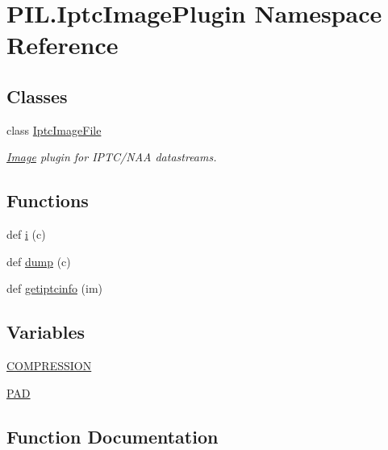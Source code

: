\hypertarget{namespacePIL_1_1IptcImagePlugin}{}\section{P\+I\+L.\+Iptc\+Image\+Plugin Namespace Reference}
\label{namespacePIL_1_1IptcImagePlugin}
\subsection*{Classes}
\begin{DoxyCompactItemize}
\item 
class \hyperlink{classPIL_1_1IptcImagePlugin_1_1IptcImageFile}{Iptc\+Image\+File}
\begin{DoxyCompactList}\small\item\em \hyperlink{namespacePIL_1_1Image}{Image} plugin for I\+P\+T\+C/\+N\+AA datastreams. \end{DoxyCompactList}\end{DoxyCompactItemize}
\subsection*{Functions}
\begin{DoxyCompactItemize}
\item 
def \hyperlink{namespacePIL_1_1IptcImagePlugin_ac39d4ec7fba7b4b99edc6d327011486b}{i} (c)
\item 
def \hyperlink{namespacePIL_1_1IptcImagePlugin_a4f96f84663e6fcf212826462ded0c953}{dump} (c)
\item 
def \hyperlink{namespacePIL_1_1IptcImagePlugin_a1f4469b0a686ee72dd1db05c82f2d921}{getiptcinfo} (im)
\end{DoxyCompactItemize}
\subsection*{Variables}
\begin{DoxyCompactItemize}
\item 
\hyperlink{namespacePIL_1_1IptcImagePlugin_a50e57a4067190efac08bde9fa1c83804}{C\+O\+M\+P\+R\+E\+S\+S\+I\+ON}
\item 
\hyperlink{namespacePIL_1_1IptcImagePlugin_ab5750c811252cfc60baf591c2ecd8723}{P\+AD}
\end{DoxyCompactItemize}


\subsection{Function Documentation}
\mbox{\label{namespacePIL_1_1IptcImagePlugin_a4f96f84663e6fcf212826462ded0c953}} 
